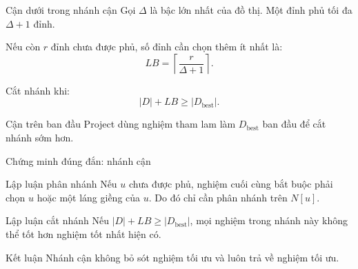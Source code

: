 \documentclass[aspectratio=169, 11pt]{beamer}
\begin{document}
\begin{frame}{Cận dưới trong nhánh cận}
  Gọi $\Delta$ là bậc lớn nhất của đồ thị. Một đỉnh phủ tối đa $\Delta+1$ đỉnh.

  Nếu còn $r$ đỉnh chưa được phủ, số đỉnh cần chọn thêm ít nhất là:
  \[
    LB=\left\lceil \frac{r}{\Delta+1}\right\rceil.
  \]

  Cắt nhánh khi:
  \[
    |D| + LB \geq |D_{\mathrm{best}}|.
  \]

  \begin{block}{Cận trên ban đầu}
    Project dùng nghiệm tham lam làm $D_{\mathrm{best}}$ ban đầu để cắt nhánh sớm hơn.
  \end{block}
\end{frame}
\begin{frame}{Chứng minh đúng đắn: nhánh cận}
  \begin{block}{Lập luận phân nhánh}
    Nếu $u$ chưa được phủ, nghiệm cuối cùng bắt buộc phải chọn $u$ hoặc một láng giềng của $u$.
    Do đó chỉ cần phân nhánh trên $N[u]$.
  \end{block}

  \begin{block}{Lập luận cắt nhánh}
    Nếu $|D|+LB \geq |D_{\mathrm{best}}|$, mọi nghiệm trong nhánh này không thể tốt hơn nghiệm tốt nhất hiện có.
  \end{block}

  \begin{alertblock}{Kết luận}
    Nhánh cận không bỏ sót nghiệm tối ưu và luôn trả về nghiệm tối ưu.
  \end{alertblock}
\end{frame}
\end{document}
